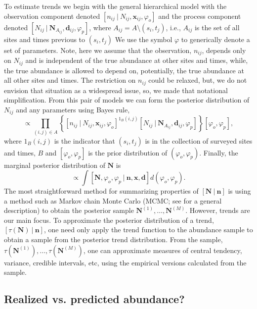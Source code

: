 \documentclass[12pt,letter]{article}
\newcommand{\Nij}{\ensuremath{N_{ij}}}
\newcommand{\nij}{\ensuremath{n_{ij}}}
\newcommand{\dij}{\ensuremath{\mathbf{d}_{ij}}}
\newcommand{\xij}{\ensuremath{\mathbf{x}_{ij}}}
\begin{document}
To estimate trends we begin with the general hierarchical model with the observation component denoted $[n_{ij}\ |\ \Nij,\xij, \varphi_o]$ and the process component denoted $[\Nij\ |\ \mathbf{N}_{A_{ij}},\dij,\varphi_p]$, where $A_{ij} = A\setminus (s_i,t_j)$, i.e., $A_{ij}$ is the set of all sites and times previous to $(s_i,t_j)$ We use the symbol $\varphi$ to generically denote a set of parameters. Note, here we assume that the observation, $\nij$, depends only on $\Nij$ and is independent of the true abundance at other sites and times, while, the true abundance is allowed to depend on, potentially, the true abundance at all other sites and times. The restriction on $\nij$ could be relaxed, but, we do not envision that situation as a widespread issue, so, we made that notational simplification. From this pair of models we can form the posterior distribution of $\Nij$ and any parameters using Bayes rule,
\begin{equation}
[\mathbf{N}, \varphi_o, \varphi_p\ |\ \mathbf{n}, \mathbf{x}, \mathbf{d}] \propto \prod_{(i,j)\in A}\left\{[n_{ij}\ |\ \Nij,\xij, \varphi_o]^{1_B(i,j)} [\Nij\ |\ \mathbf{N}_{A_{ij}}, \dij, \varphi_p]\right\}[\varphi_o, \varphi_p],
\end{equation}
where $1_B(i,j)$ is the indicator that $(s_i,t_j)$ is in the collection of surveyed sites and times, $B$ and $[\varphi_o, \varphi_p]$ is the prior distribution of $(\varphi_o, \varphi_p)$. Finally, the marginal posterior distribution of $\mathbf{N}$ is 
\begin{equation}
[\mathbf{N}|\mathbf{n}] \propto \int [\mathbf{N}, \varphi_o, \varphi_p\ |\ \mathbf{n}, \mathbf{x}, \mathbf{d}]d(\varphi_o,\varphi_p).\end{equation}
The most straightforward method for summarizing properties of $[\mathbf{N}\ |\ \mathbf{n}]$ is using a method such as Markov chain Monte Carlo (MCMC; see \citealt{Givens:2005dy} for a general description) to obtain the posterior sample $\mathbf{N}^{(1)},\dots,\mathbf{N}^{(M)}$.  However, trends are our main focus. To approximate the posterior distribution of a trend, $[\tau(\mathbf{N})\ |\ \mathbf{n}]$, one need only apply the trend function to the abundance sample to obtain a sample from the posterior trend distribution. From the sample, $\tau(\mathbf{N}^{(1)}),\dots,\tau(\mathbf{N}^{(M)})$, one can approximate measures of central tendency, variance, credible intervals, etc, using the empirical versions calculated from the sample.



\subsection{Realized vs. predicted abundance?}
\end{document}
